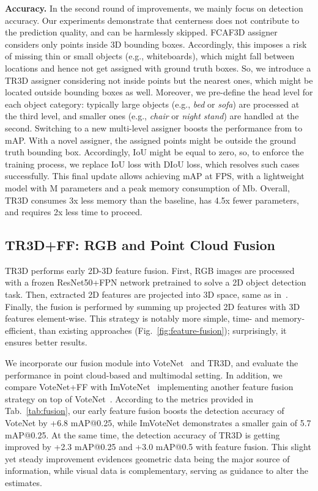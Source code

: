 \documentclass{article}
\def\ours{TR3D}
\def\oursff{TR3D+FF}
\newcommand\inline{\noindent\textbf}
\begin{document}
\inline{Accuracy.} In the second round of improvements, we mainly focus on detection accuracy. Our experiments demonstrate that centerness does not contribute to the prediction quality, and can be harmlessly skipped. FCAF3D assigner considers only points inside 3D bounding boxes. Accordingly, this imposes a risk of missing thin or small objects (e.g., whiteboards), which might fall between locations and hence not get assigned with ground truth boxes. So, we introduce a \ours{} assigner considering not inside points but the nearest ones, which might be located outside bounding boxes as well. Moreover, we pre-define the head level for each object category: typically large objects (e.g., \textit{bed} or \textit{sofa}) are processed at the third level, and smaller ones (e.g., \textit{chair} or \textit{night stand}) are handled at the second. Switching to a new multi-level assigner boosts the performance from  to  mAP. With a novel assigner, the assigned points might be outside the ground truth bounding box. Accordingly, IoU might be equal to zero, so, to enforce the training process, we replace IoU loss with DIoU loss, which resolves such cases successfully. This final update allows achieving  mAP at  FPS, with a lightweight model with M parameters and a peak memory consumption of  Mb. Overall, \ours{} consumes 3x less memory than the baseline, has 4.5x fewer parameters, and requires 2x less time to proceed.

\subsection{\oursff: RGB and Point Cloud Fusion}
\label{ssec:feature-fusion}

\ours{} performs early 2D-3D feature fusion. First, RGB images are processed with a frozen ResNet50+FPN network pretrained to solve a 2D object detection task. Then, extracted 2D features are projected into 3D space, same as in~\cite{rukhovich2021imvoxelnet}. Finally, the fusion is performed by summing up projected 2D features with 3D features element-wise. This strategy is notably more simple, time- and memory-efficient, than existing approaches (Fig.~\ref{fig:feature-fusion}); surprisingly, it ensures better results.

We incorporate our fusion module into VoteNet~\cite{qi2019votenet} and \ours, and evaluate the performance in point cloud-based and multimodal setting. In addition, we compare VoteNet+FF with ImVoteNet~\cite{qi2020imvotenet} implementing another feature fusion strategy on top of VoteNet~\cite{qi2019votenet}. According to the metrics provided in Tab.~\ref{tab:fusion}, our early feature fusion boosts the detection accuracy of VoteNet by +6.8 mAP@0.25, while ImVoteNet demonstrates a smaller gain of 5.7 mAP@0.25. At the same time, the detection accuracy of \ours{} is getting improved by +2.3 mAP@0.25 and +3.0 mAP@0.5 with feature fusion. This slight yet steady improvement evidences geometric data being the major source of information, while visual data is complementary, serving as guidance to alter the estimates. 
\end{document}
